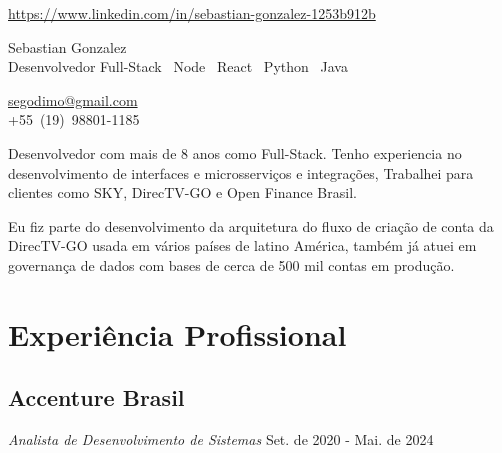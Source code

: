 \documentclass[a4paper,10pt]{article}
\makeatletter
\newcommand{\linkedin}{https://www.linkedin.com/in/sebastian-gonzalez-1253b912b}
\newcommand{\mobile}{+55~(19)~98801-1185}
\newcommand{\email}{segodimo@gmail.com}
\makeatother
\begin{document}
\noindent %


\hfill\textcolor{corSection}{\href{\linkedin}{\linkedin}} 
\begin{minipage}[t]{0.7\textwidth}
  \raggedright %
  \vspace{6mm} %
  \Huge{\textcolor{corHuge}{Sebastian Gonzalez}} \\
  \vspace{2mm} %
  \large{\textcolor{corLarge}{Desenvolvedor Full-Stack}} \textbar\ 
  \large{\textcolor{corLarge}{Node}} \textbar\
  \large{\textcolor{corLarge}{React}} \textbar\
  \large{\textcolor{corLarge}{Python}} \textbar\
  \large{\textcolor{corLarge}{Java}}
\end{minipage}%
\begin{minipage}[t]{0.3\textwidth}
  \raggedleft %
  \setlength{\parskip}{0pt} %
  \textcolor{corSection}{\href{mailto:\email}{\email}} \\
  \textcolor{corSection}{\mobile} 

\end{minipage}

\vspace{5mm}

Desenvolvedor com mais de 8 anos como Full-Stack.
Tenho experiencia no desenvolvimento de interfaces e microsserviços e integrações,
Trabalhei para clientes como SKY, DirecTV-GO
e Open Finance Brasil.

Eu fiz parte do desenvolvimento da arquitetura do fluxo de criação de conta da DirecTV-GO
usada em vários países de latino América,
também já atuei em governança de dados com bases de cerca de 500 mil contas em produção.

\section*{Experiência Profissional}
\noindent\makebox[\linewidth]{\rule{\linewidth}{0.1mm}\textcolor{corLarge}{}}

\subsection*{Accenture Brasil}
\textcolor{corSubSection}{\emph{Analista de Desenvolvimento de Sistemas}}
\hfill \textcolor{corSubSection}{Set. de 2020 - Mai. de 2024}
\end{document}
